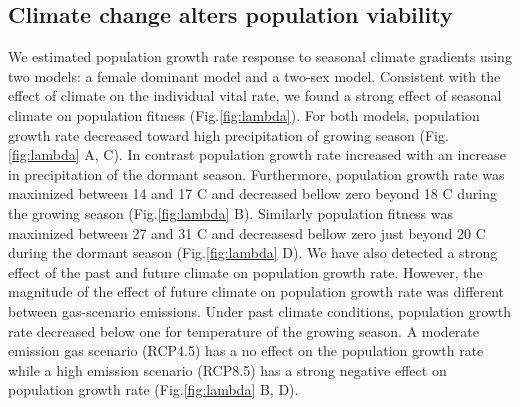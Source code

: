 \documentclass[12pt]{article}
\begin{document}
\subsection*{Climate change alters population viability}
We estimated population growth rate response to seasonal climate gradients using two models: a female dominant model and a two-sex model. 
Consistent with the effect of climate on the individual vital rate, we found a strong effect of seasonal climate on population fitness (Fig.\ref{fig:lambda}). 
For both models, population growth rate decreased toward high precipitation of growing season (Fig.\ref{fig:lambda} A, C). 
In contrast population growth rate increased with an increase in precipitation of the dormant season.
Furthermore, population growth rate was maximized between 14 and 17 \degree C and decreased bellow zero beyond 18 \degree C during the growing season (Fig.\ref{fig:lambda} B).
Similarly population fitness was maximized between 27 and 31 \degree C and decreasesd bellow zero just beyond 20 \degree C during the dormant season (Fig.\ref{fig:lambda} D).
We have also detected a strong effect of the past and future climate on population growth rate. 
However, the magnitude of the effect of future climate on population growth rate was different between gas-scenario emissions. 
Under past climate conditions, population growth rate decreased below one for temperature of the growing season.
A moderate emission gas scenario (RCP4.5) has a no effect on the population growth rate while a high emission scenario (RCP8.5) has a strong negative effect on population growth rate (Fig.\ref{fig:lambda} B, D). 
\end{document}
